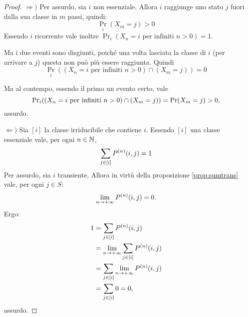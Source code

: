 \begin{proof}
	$\Rightarrow)$
	Per assurdo, sia $i$ non essenziale. Allora $i$ raggiunge uno stato $j$ fuori dalla sua classe in $m$ passi, quindi:
	\begin{equation*}
		\Pr_i(X_m=j)>0
	\end{equation*}
	Essendo $i$ ricorrente vale inoltre $\Pr_i(X_n=i \text{ per infiniti $n>0$})=1$.

	Ma i due eventi sono disgiunti, poiché una volta lasciata la classe di $i$ (per arrivare a $j$) questa non può più essere raggiunta. Quindi
	\begin{equation*}
		\Pr_i((X_n=i \text{ per infiniti $n>0$})\cap(X_m=j)) = 0
	\end{equation*}

	Ma al contempo, essendo il primo un evento certo, vale
	\begin{equation*}
		\Pr_i((X_n=i \text{ per infiniti $n>0$})\cap(X_m=j)) = \Pr(X_m=j)>0 \text,
	\end{equation*}
	assurdo.

	$\Leftarrow)$
	Sia $[i]$ la classe irriducibile che contiene $i$. Essendo $[i]$ una classe essenziale vale, per ogni $n\in\N$,
	\begin{equation*}
		\sum_{j\in[i]} P\ape{n}(i,j) = 1
	\end{equation*}
	Per assurdo, sia $i$ transiente. Allora in virtù della proposizione \ref{prop:sumtrans} vale, per ogni $j\in S$:
	\begin{equation*}
		\lim_{n\to+\infty} P\ape{n}(i,j) = 0 \text.
	\end{equation*}
	Ergo:
	\begin{align*}
		1 & = \sum_{j\in[i]} P\ape{n}(i,j)                    \\
		  & = \lim_{n\to+\infty} \sum_{j\in[i]} P\ape{n}(i,j) \\
		  & = \sum_{j\in[i]} \lim_{n\to+\infty} P\ape{n}(i,j) \\
		  & = \sum_{j\in[i]} 0 = 0 \text,
	\end{align*}
	assurdo. \qedhere
\end{proof}
